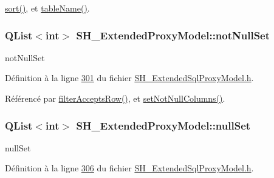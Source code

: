 \hyperlink{classSH__ExtendedProxyModel_a2d5fdb58bf67879e3f3130619b93104a}{sort()}, et \hyperlink{classSH__ExtendedProxyModel_abb133e196ca7cf90b9c9b57263e898d6}{table\-Name()}.

\hypertarget{classSH__ExtendedProxyModel_ac17eb2c65d47f6dc6dd322e0a39bbe3e}{
\subsubsection[{not\-Null\-Set}]{\setlength{\rightskip}{0pt plus 5cm}Q\-List$<$int$>$ S\-H\-\_\-\-Extended\-Proxy\-Model\-::not\-Null\-Set\hspace{0.3cm}{\ttfamily [private]}}}\label{classSH__ExtendedProxyModel_ac17eb2c65d47f6dc6dd322e0a39bbe3e}


not\-Null\-Set 



Définition à la ligne \hyperlink{SH__ExtendedSqlProxyModel_8h_source_l00301}{301} du fichier \hyperlink{SH__ExtendedSqlProxyModel_8h_source}{S\-H\-\_\-\-Extended\-Sql\-Proxy\-Model.\-h}.



Référencé par \hyperlink{classSH__ExtendedProxyModel_a1eda169699702a7bfed4dfa8718c0b86}{filter\-Accepts\-Row()}, et \hyperlink{classSH__ExtendedProxyModel_a9211b1bc09442298367565d7e0f62de4}{set\-Not\-Null\-Columns()}.

\hypertarget{classSH__ExtendedProxyModel_a0a3818c6f8e4b73d1b5b47b2914cb56d}{
\subsubsection[{null\-Set}]{\setlength{\rightskip}{0pt plus 5cm}Q\-List$<$int$>$ S\-H\-\_\-\-Extended\-Proxy\-Model\-::null\-Set\hspace{0.3cm}{\ttfamily [private]}}}\label{classSH__ExtendedProxyModel_a0a3818c6f8e4b73d1b5b47b2914cb56d}


null\-Set 



Définition à la ligne \hyperlink{SH__ExtendedSqlProxyModel_8h_source_l00306}{306} du fichier \hyperlink{SH__ExtendedSqlProxyModel_8h_source}{S\-H\-\_\-\-Extended\-Sql\-Proxy\-Model.\-h}.




